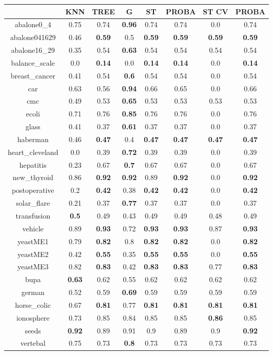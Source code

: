 \documentclass{article}%
\begin{document}
\begin{tabular}{c|ccccccc}%
\hline%
&KNN&TREE&G&ST&PROBA&ST CV&PROBA\\%
\hline%
abalone0\_4&0.75&0.74&\textbf{0.96}&0.74&0.74&0.0&0.74\\%
\hline%
abalone041629&0.46&\textbf{0.59}&0.5&\textbf{0.59}&\textbf{0.59}&\textbf{0.59}&\textbf{0.59}\\%
\hline%
abalone16\_29&0.35&0.54&\textbf{0.63}&0.54&0.54&0.54&0.54\\%
\hline%
balance\_scale&0.0&\textbf{0.14}&0.0&\textbf{0.14}&\textbf{0.14}&0.0&\textbf{0.14}\\%
\hline%
breast\_cancer&0.41&0.54&\textbf{0.6}&0.54&0.54&0.0&0.54\\%
\hline%
car&0.63&0.56&\textbf{0.94}&0.66&0.65&0.0&0.66\\%
\hline%
cmc&0.49&0.53&\textbf{0.65}&0.53&0.53&0.53&0.53\\%
\hline%
ecoli&0.71&0.76&\textbf{0.85}&0.76&0.76&0.0&0.76\\%
\hline%
glass&0.41&0.37&\textbf{0.61}&0.37&0.37&0.0&0.37\\%
\hline%
haberman&0.46&\textbf{0.47}&0.4&\textbf{0.47}&\textbf{0.47}&\textbf{0.47}&\textbf{0.47}\\%
\hline%
heart\_cleveland&0.0&0.39&\textbf{0.72}&0.39&0.39&0.0&0.39\\%
\hline%
hepatitis&0.23&0.67&\textbf{0.7}&0.67&0.67&0.0&0.67\\%
\hline%
new\_thyroid&0.86&\textbf{0.92}&\textbf{0.92}&0.89&\textbf{0.92}&0.0&\textbf{0.92}\\%
\hline%
postoperative&0.2&\textbf{0.42}&0.38&\textbf{0.42}&\textbf{0.42}&0.0&\textbf{0.42}\\%
\hline%
solar\_flare&0.21&0.37&\textbf{0.77}&0.37&0.37&0.0&0.37\\%
\hline%
transfusion&\textbf{0.5}&0.49&0.43&0.49&0.49&0.48&0.49\\%
\hline%
vehicle&0.89&\textbf{0.93}&0.72&\textbf{0.93}&\textbf{0.93}&0.87&\textbf{0.93}\\%
\hline%
yeastME1&0.79&\textbf{0.82}&0.8&\textbf{0.82}&\textbf{0.82}&0.0&\textbf{0.82}\\%
\hline%
yeastME2&0.42&\textbf{0.55}&0.35&\textbf{0.55}&\textbf{0.55}&0.0&\textbf{0.55}\\%
\hline%
yeastME3&0.82&\textbf{0.83}&0.42&\textbf{0.83}&\textbf{0.83}&0.77&\textbf{0.83}\\%
\hline%
bupa&\textbf{0.63}&0.62&0.55&0.62&0.62&0.62&0.62\\%
\hline%
german&0.52&0.59&\textbf{0.69}&0.59&0.59&0.59&0.59\\%
\hline%
horse\_colic&0.67&\textbf{0.81}&0.77&\textbf{0.81}&\textbf{0.81}&\textbf{0.81}&\textbf{0.81}\\%
\hline%
ionosphere&0.73&0.85&0.84&0.85&0.85&\textbf{0.86}&0.85\\%
\hline%
seeds&\textbf{0.92}&0.89&0.91&0.9&0.89&0.9&\textbf{0.92}\\%
\hline%
vertebal&0.75&0.73&\textbf{0.8}&0.73&0.73&0.73&0.73\\%
\hline%
\end{tabular}

%
\end{document}

